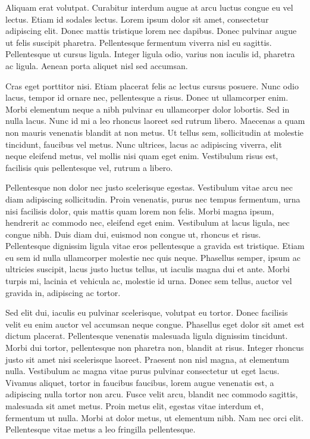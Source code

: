 \documentclass{ritsi/book}
\begin{document}
Aliquam erat volutpat. Curabitur interdum augue at arcu luctus congue eu vel lectus. Etiam id sodales lectus. Lorem ipsum dolor sit amet, consectetur adipiscing elit. Donec mattis tristique lorem nec dapibus. Donec pulvinar augue ut felis suscipit pharetra. Pellentesque fermentum viverra nisl eu sagittis. Pellentesque ut cursus ligula. Integer ligula odio, varius non iaculis id, pharetra ac ligula. Aenean porta aliquet nisl sed accumsan.

Cras eget porttitor nisi. Etiam placerat felis ac lectus cursus posuere. Nunc odio lacus, tempor id ornare nec, pellentesque a risus. Donec ut ullamcorper enim. Morbi elementum neque a nibh pulvinar eu ullamcorper dolor lobortis. Sed in nulla lacus. Nunc id mi a leo rhoncus laoreet sed rutrum libero. Maecenas a quam non mauris venenatis blandit at non metus. Ut tellus sem, sollicitudin at molestie tincidunt, faucibus vel metus. Nunc ultrices, lacus ac adipiscing viverra, elit neque eleifend metus, vel mollis nisi quam eget enim. Vestibulum risus est, facilisis quis pellentesque vel, rutrum a libero.

Pellentesque non dolor nec justo scelerisque egestas. Vestibulum vitae arcu nec diam adipiscing sollicitudin. Proin venenatis, purus nec tempus fermentum, urna nisi facilisis dolor, quis mattis quam lorem non felis. Morbi magna ipsum, hendrerit ac commodo nec, eleifend eget enim. Vestibulum at lacus ligula, nec congue nibh. Duis diam dui, euismod non congue ut, rhoncus et risus. Pellentesque dignissim ligula vitae eros pellentesque a gravida est tristique. Etiam eu sem id nulla ullamcorper molestie nec quis neque. Phasellus semper, ipsum ac ultricies suscipit, lacus justo luctus tellus, ut iaculis magna dui et ante. Morbi turpis mi, lacinia et vehicula ac, molestie id urna. Donec sem tellus, auctor vel gravida in, adipiscing ac tortor.

Sed elit dui, iaculis eu pulvinar scelerisque, volutpat eu tortor. Donec facilisis velit eu enim auctor vel accumsan neque congue. Phasellus eget dolor sit amet est dictum placerat. Pellentesque venenatis malesuada ligula dignissim tincidunt. Morbi dui tortor, pellentesque non pharetra non, blandit at risus. Integer rhoncus justo sit amet nisi scelerisque laoreet. Praesent non nisl magna, at elementum nulla. Vestibulum ac magna vitae purus pulvinar consectetur ut eget lacus. Vivamus aliquet, tortor in faucibus faucibus, lorem augue venenatis est, a adipiscing nulla tortor non arcu. Fusce velit arcu, blandit nec commodo sagittis, malesuada sit amet metus. Proin metus elit, egestas vitae interdum et, fermentum ut nulla. Morbi at dolor metus, ut elementum nibh. Nam nec orci elit. Pellentesque vitae metus a leo fringilla pellentesque.
\end{document}
